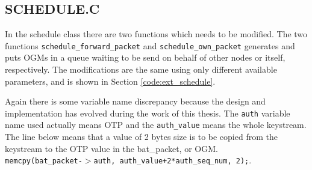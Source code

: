 \subsection{SCHEDULE.C}\label{subsect:schedule.c}
In the schedule class there are two functions which needs to be modified. The
two functions \texttt{schedule\_forward\_packet} and
\texttt{schedule\_own\_packet} generates and puts \acp{OGM} in a queue waiting
to be send on behalf of other nodes or itself, respectively. The modifications
are the same using only different available parameters, and is shown in Section
\ref{code:ext_schedule}.

Again there is some variable name discrepancy because the design and
implementation has evolved during the work of this thesis. The \texttt{auth}
variable name used actually means \ac{OTP} and the \texttt{auth\_value} means
the whole keystream. The line below means that a value of 2 bytes size is to
be copied from the keystream to the OTP value in the bat\_packet, or OGM.\\
\texttt{memcpy(bat\_packet-$>$auth, auth\_value+2*auth\_seq\_num, 2);}.
